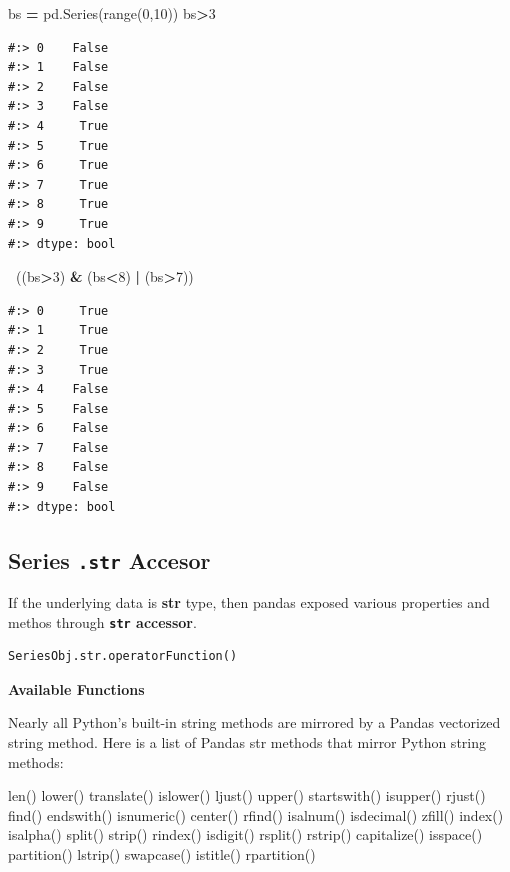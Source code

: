\documentclass[
]{book}
\newenvironment{Shaded}{\begin{snugshade}}{\end{snugshade}}
\newcommand{\BuiltInTok}[1]{#1}
\newcommand{\DecValTok}[1]{\textcolor[rgb]{0.06,0.06,0.06}{#1}}
\newcommand{\NormalTok}[1]{#1}
\newcommand{\OperatorTok}[1]{\textcolor[rgb]{0.43,0.43,0.43}{\textbf{#1}}}
\begin{document}
\begin{Shaded}
\begin{Highlighting}[]
\NormalTok{bs }\OperatorTok{=}\NormalTok{ pd.Series(}\BuiltInTok{range}\NormalTok{(}\DecValTok{0}\NormalTok{,}\DecValTok{10}\NormalTok{))}
\NormalTok{bs}\OperatorTok{>}\DecValTok{3}
\end{Highlighting}
\end{Shaded}

\begin{verbatim}
#:> 0    False
#:> 1    False
#:> 2    False
#:> 3    False
#:> 4     True
#:> 5     True
#:> 6     True
#:> 7     True
#:> 8     True
#:> 9     True
#:> dtype: bool
\end{verbatim}

\begin{Shaded}
\begin{Highlighting}[]
\OperatorTok{~}\NormalTok{((bs}\OperatorTok{>}\DecValTok{3}\NormalTok{) }\OperatorTok{&}\NormalTok{ (bs}\OperatorTok{<}\DecValTok{8}\NormalTok{) }\OperatorTok{|}\NormalTok{ (bs}\OperatorTok{>}\DecValTok{7}\NormalTok{))}
\end{Highlighting}
\end{Shaded}

\begin{verbatim}
#:> 0     True
#:> 1     True
#:> 2     True
#:> 3     True
#:> 4    False
#:> 5    False
#:> 6    False
#:> 7    False
#:> 8    False
#:> 9    False
#:> dtype: bool
\end{verbatim}

\hypertarget{series-.str-accesor}{%
\subsection{\texorpdfstring{Series \texttt{.str} Accesor}{Series .str Accesor}}\label{series-.str-accesor}}

If the underlying data is \textbf{str} type, then pandas exposed various properties and methos through \textbf{\texttt{str} accessor}.

\begin{verbatim}
SeriesObj.str.operatorFunction()
\end{verbatim}

\textbf{Available Functions}

Nearly all Python's built-in string methods are mirrored by a Pandas vectorized string method. Here is a list of Pandas str methods that mirror Python string methods:

len() lower() translate() islower() ljust() upper() startswith() isupper() rjust() find() endswith() isnumeric() center() rfind() isalnum() isdecimal() zfill() index() isalpha() split() strip() rindex() isdigit() rsplit() rstrip() capitalize() isspace() partition() lstrip() swapcase() istitle() rpartition()
\end{document}
